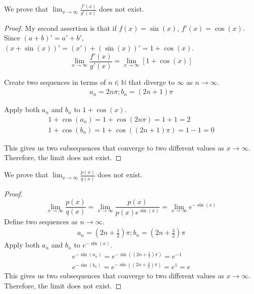\documentclass[11pt]{article}
\begin{document}
        We prove that $\lim_{x \to \infty} \frac{f'(x)}{g'(x)}$ does not exist.
        \begin{proof}
            My second assertion is that if $f(x) = \sin(x)$, $f'(x) = \cos(x)$.
            Since $(a + b)' = a' + b'$, $(x + \sin(x))' = (x') + (\sin(x))' = 1 + \cos(x)$.
            \begin{equation}
                \lim_{x \to \infty} \frac{f'(x)}{g'(x)} = \lim_{x \to \infty}\left[ 1 + \cos(x) \right]
            \end{equation}

            Create two sequences in terms of $n \in \mathbb{N}$ that diverge to $\infty$ as $n \to \infty$.
            \begin{gather}
                a_n = 2n\pi;
                b_n = (2n+1)\pi
            \end{gather}

            Apply both $a_n$ and $b_n$ to $1 + \cos(x)$.
            \begin{gather}
                1 + \cos(a_n) = 1 + \cos(2n\pi) = 1 + 1 = 2\\
                1 + \cos(b_n) = 1 + \cos((2n+1)\pi) = 1 - 1 = 0
            \end{gather}

            This gives us two subsequences that converge to two different values as $x \to \infty$.
            Therefore, the limit does not exist.
        \end{proof}
        
        We prove that $\lim_{x \to \infty} \frac{p(x)}{q(x)}$ does not exist.
        \begin{proof}
            \begin{equation}
                \lim_{x \to \infty} \frac{p(x)}{q(x)} = \lim_{x \to \infty} \frac{p(x)}{p(x) e^{\sin(x)}}
                    =   \lim_{x \to \infty} e^{-\sin(x)}
            \end{equation}
            Define two sequences as $n \to \infty$.
            \begin{gather*}
                a_n = \left(2n + \frac{1}{2}\right)\pi; b_n = \left(2n + \frac{3}{2}\right)\pi
            \end{gather*}
            Apply both $a_n$ and $b_n$ to $e^{-\sin(x)}$.
            \begin{gather}
                e^{-\sin(a_n)} = e^{-\sin(\left(2n + \frac{1}{2}\right)\pi)} = e^{-1}\\
                e^{-\sin(b_n)} = e^{-\sin(\left(2n + \frac{3}{2}\right)\pi)} = e^{1} = e
            \end{gather}
            This gives us two subsequences that converge to two different values as $x \to \infty$.
            Therefore, the limit does not exist.
        \end{proof}
        
\end{document}
